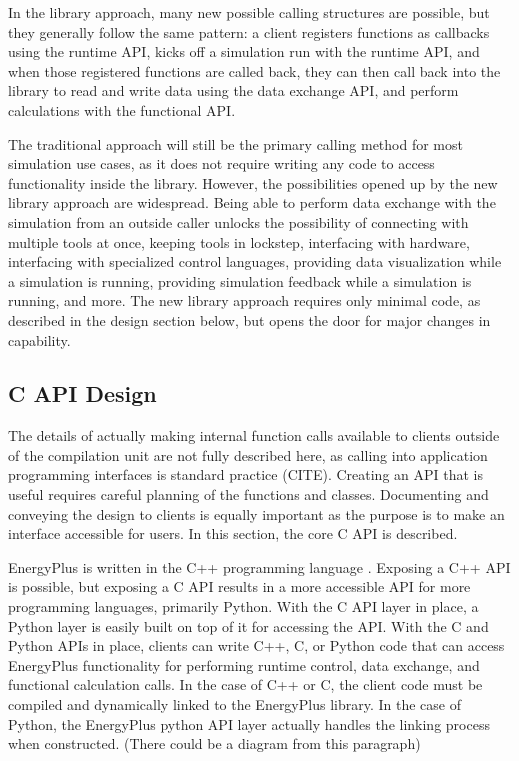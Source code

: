 \documentclass[5p]{elsarticle}
\begin{document}
In the library approach, many new possible calling structures are possible, but they generally follow the same pattern: a client registers functions as callbacks using the runtime API, kicks off a simulation run with the runtime API, and when those registered functions are called back, they can then call back into the library to read and write data using the data exchange API, and perform calculations with the functional API.

The traditional approach will still be the primary calling method for most simulation use cases, as it does not require writing any code to access functionality inside the library.  However, the possibilities opened up by the new library approach are widespread.  Being able to perform data exchange with the simulation from an outside caller unlocks the possibility of connecting with multiple tools at once, keeping tools in lockstep, interfacing with hardware, interfacing with specialized control languages, providing data visualization while a simulation is running, providing simulation feedback while a simulation is running, and more.  The new library approach requires only minimal code, as described in the design section below, but opens the door for major changes in capability.

  \subsection{C API Design}
The details of actually making internal function calls available to clients outside of the compilation unit are not fully described here, as calling into application programming interfaces is standard practice (CITE).  Creating an API that is useful requires careful planning of the functions and classes.  Documenting and conveying the design to clients is equally important as the purpose is to make an interface accessible for users.  In this section, the core C API is described.

EnergyPlus is written in the C++ programming language \cite{Stroustrup1995}.  Exposing a C++ API is possible, but exposing a C API results in a more accessible API for more programming languages, primarily Python.  With the C API layer in place, a Python layer is easily built on top of it for accessing the API.  With the C and Python APIs in place, clients can write C++, C, or Python code that can access EnergyPlus functionality for performing runtime control, data exchange, and functional calculation calls.  In the case of C++ or C, the client code must be compiled and dynamically linked to the EnergyPlus library.  In the case of Python, the EnergyPlus python API layer actually handles the linking process when constructed.  (There could be a diagram from this paragraph)
\end{document}
